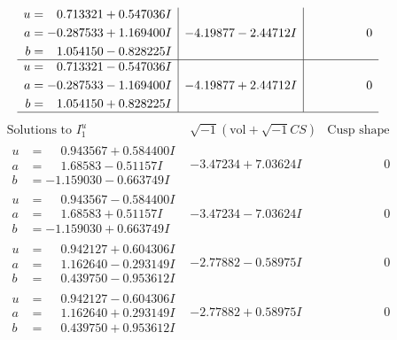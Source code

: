 \documentclass[1p]{elsarticle_modified}
\theoremstyle{definition}
\newcommand{\I}{\sqrt{-1}}
\begin{document}
$$\begin{array}{c|c|c}
\begin{aligned}
u &= \phantom{-}0.713321 + 0.547036 I \\
a &= -0.287533 + 1.169400 I \\
b &= \phantom{-}1.054150 - 0.828225 I\end{aligned}
 & -4.19877 - 2.44712 I & \phantom{-0.000000 } 0 \\ \hline\begin{aligned}
u &= \phantom{-}0.713321 - 0.547036 I \\
a &= -0.287533 - 1.169400 I \\
b &= \phantom{-}1.054150 + 0.828225 I\end{aligned}
 & -4.19877 + 2.44712 I & \phantom{-0.000000 } 0\\
 \hline 
 \end{array}$$\newpage$$\begin{array}{c|c|c}  
\text{Solutions to }I^u_{1}& \I (\text{vol} + \sqrt{-1}CS) & \text{Cusp shape}\\
 \hline 
\begin{aligned}
u &= \phantom{-}0.943567 + 0.584400 I \\
a &= \phantom{-}1.68583 - 0.51157 I \\
b &= -1.159030 - 0.663749 I\end{aligned}
 & -3.47234 + 7.03624 I & \phantom{-0.000000 } 0 \\ \hline\begin{aligned}
u &= \phantom{-}0.943567 - 0.584400 I \\
a &= \phantom{-}1.68583 + 0.51157 I \\
b &= -1.159030 + 0.663749 I\end{aligned}
 & -3.47234 - 7.03624 I & \phantom{-0.000000 } 0 \\ \hline\begin{aligned}
u &= \phantom{-}0.942127 + 0.604306 I \\
a &= \phantom{-}1.162640 - 0.293149 I \\
b &= \phantom{-}0.439750 - 0.953612 I\end{aligned}
 & -2.77882 - 0.58975 I & \phantom{-0.000000 } 0 \\ \hline\begin{aligned}
u &= \phantom{-}0.942127 - 0.604306 I \\
a &= \phantom{-}1.162640 + 0.293149 I \\
b &= \phantom{-}0.439750 + 0.953612 I\end{aligned}
 & -2.77882 + 0.58975 I & \phantom{-0.000000 } 0 \\ \hline\begin{aligned}

\end{aligned}
\end{array}$$
\end{document}
